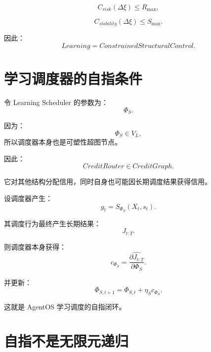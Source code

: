 \begin{equation}
C_{risk}(\Delta\xi)
\leq
R_{\max},
\end{equation}

\begin{equation}
C_{stability}(\Delta\xi)
\leq
S_{\max}.
\end{equation}

因此：
\begin{equation}
\boxed{
Learning
=
ConstrainedStructuralControl.
}
\end{equation}


\section{学习调度器的自指条件}

令 Learning Scheduler 的参数为：
\begin{equation}
\Phi_S.
\end{equation}

因为：
\begin{equation}
\Phi_S
\in
V_L,
\end{equation}
所以调度器本身也是可塑性超图节点。

因此：
\begin{equation}
\boxed{
CreditRouter
\in
CreditGraph.
}
\end{equation}

它对其他结构分配信用，同时自身也可能因长期调度结果获得信用。

设调度器产生：
\begin{equation}
g_t
=
S_{\Phi_S}(X_t,s_t).
\end{equation}

其调度行为最终产生长期结果：
\begin{equation}
J_{t:T}.
\end{equation}

则调度器本身获得：
\begin{equation}
c_{\Phi_S}
=
\widehat{
\frac{\partial J_{t:T}}
{\partial \Phi_S}
}.
\end{equation}

并更新：
\begin{equation}
\boxed{
\Phi_{S,t+1}
=
\Phi_{S,t}
+
\eta_S
c_{\Phi_S}.
}
\end{equation}

这就是 AgentOS 学习调度的自指闭环。


\section{自指不是无限元递归}

